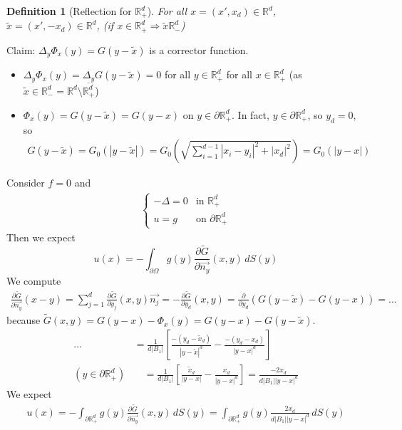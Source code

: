 \documentclass{report}
\theoremstyle{tommy}
\newtheorem{defn}{Definition}
\begin{document}
  
  \begin{defn}[Reflection for \(\mathbb{R}_+^d\)] 
    For all \(x = (x', x_d) \in \mathbb{R}^d\), \(\tilde x = (x', -x_d) \in \mathbb{R}^d\), (if \(x \in \mathbb{R}_+^d \Rightarrow \tilde x \mathbb{R}_-^d\)) 
  \end{defn}
    
  Claim: \(\Delta_y \Phi_x(y) = G(y - \tilde x)\) is a corrector function.
  \begin{itemize}
    \item \(\Delta_y \Phi_x(y) = \Delta_y G(y-\tilde x) = 0\) for all \(y \in \mathbb{R}_+^d\) for all \(x \in \mathbb{R}_+^d\) (as \(\tilde x \in \mathbb{R}_-^d = \mathbb{R}^d \setminus \overline{\mathbb{R}_+^d}\))
    \item \(\Phi_x(y) = G(y-\tilde x) = G(y-x)\) on \(y \in \partial \mathbb{R}_+^d\). In fact, \(y \in \partial \mathbb{R}_+^d\), so \(y_d = 0\), so 
    \begin{align*}
      G(y - \tilde x) = G_0(|y-\tilde x|) = G_0\left(\sqrt{\sum_{i=1}^{d-1} |x_i - y_i|^2 +|x_d|^2}\right) = G_0(|y-x|)
    \end{align*}
  \end{itemize}
  Consider \(f = 0\) and 
  \begin{align*}
    \begin{cases}
      - \Delta = 0 &\text{in } \mathbb{R}_+^d \\ u = g & \text{on } \partial \mathbb{R}_+^d
    \end{cases}
  \end{align*}
  Then we expect \[u(x) = - \int_{\partial \Omega} g(y) \frac{\partial \tilde G}{\partial \vec{n_y}}(x,y) \, dS(y)\]
  We compute
  \begin{align*}
    \frac{\partial \tilde G}{\partial \vec{n_y}}(x-y) = \sum_{j=1}^d \frac{\partial \tilde G}{\partial y_j}(x,y) \vec{n_j} = - \frac{\partial \tilde G}{\partial y_d}(x,y) = \frac{\partial }{\partial y_d}(G(y-\tilde x) - G(y-x)) = \dots
  \end{align*}
  because \(\tilde G(x,y) = G(y-x) - \Phi_x(y) = G(y-x) - G(y-\tilde x)\). 
  \begin{align*}
    \dots &= \frac{1}{d |B_1|} \left[\frac{-(y_d - \tilde x_d)}{|y-\tilde x|^d} - \frac{-(y_d-x_d)}{|y-x|^d}\right] \\
    (y \in \partial \mathbb{R}_+^d) &\quad= \frac{1}{d|B_1|} \left[\frac{\tilde x_d}{|y-x|} - \frac{x_d}{|y-x|^d}\right]
    = \frac{- 2 x_d}{d |B_1| |y-x|^d}
  \end{align*}
  We expect
  \begin{align*}
    u(x) = - \int_{\partial \mathbb{R}_+^d} g(y) \frac{\partial \tilde G}{\partial \vec{n_y}} (x,y) \, dS(y) = \int_{\partial \mathbb{R}_+^d} g(y) \frac{2x_d}{d |B_1| |y-x|^d} \, dS(y)
  \end{align*}
  
\end{document}

